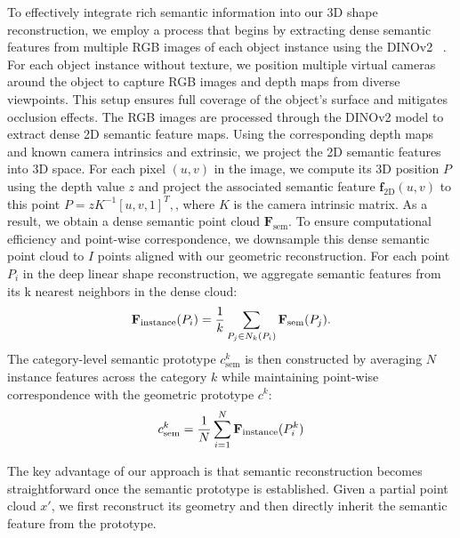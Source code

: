 To effectively integrate rich semantic information into our 3D shape reconstruction, we employ a process that begins by extracting dense semantic features from multiple RGB images of each object instance using the DINOv2 ~\cite{oquab2023dinov2}. For each object instance without texture, we position multiple virtual cameras around the object to capture RGB images and depth maps from diverse viewpoints. This setup ensures full coverage of the object's surface and mitigates occlusion effects. The RGB images are processed through the DINOv2 model to extract dense 2D semantic feature maps.  Using the corresponding depth maps and known camera intrinsics and extrinsic, we project the 2D semantic features into 3D space. For each pixel $(u, v)$ in the image, we compute its 3D position ${P}$ using the depth value $z$ and project the associated semantic feature $\mathbf{f}_{2 \mathrm{D}}(u, v)$ to this point ${P}=z K^{-1}[u, v,1]^T,$, where $K$ is the camera intrinsic matrix. As a result, we obtain a dense semantic point cloud $\mathbf{F}_{\text{sem}}$. To ensure computational efficiency and point-wise correspondence, we downsample this dense semantic point cloud to $I$ points aligned with our geometric reconstruction. For each point $P_i$ in the deep linear shape reconstruction, we aggregate semantic features from its k nearest neighbors in the dense cloud:
\begin{equation}
\vspace{-0.1cm}
\mathbf{F}_{\text{instance}}(P_i) = \frac{1}{k}\sum_{P_j \in N_k(P_i)} \mathbf{F}_{\text{sem}}(P_j).
\vspace{-0.1cm}
\end{equation}
The category-level semantic prototype $c^k_{\text{sem}}$ is then constructed by averaging $N$ instance features across the category $k$ while maintaining point-wise correspondence with the geometric prototype $c^k$:
\begin{equation}
\vspace{-0.1cm}
c^k_{\text{sem}} = \frac{1}{N}\sum_{i=1}^N \mathbf{F}_{\text{instance}}(P^k_i)
\vspace{-0.1cm}
\label{equ:knn}
\end{equation}

The key advantage of our approach is that semantic reconstruction becomes straightforward once the semantic prototype is established. Given a partial point cloud $x'$, we first reconstruct its geometry and then directly inherit the semantic feature from the prototype.


